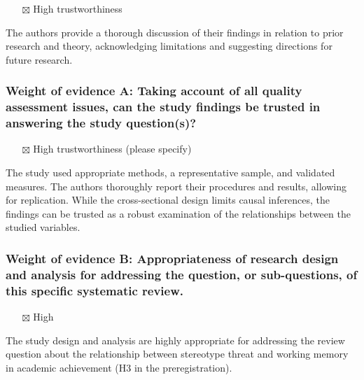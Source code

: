 \documentclass[
  doc, a4paper]{apa7}
\providecommand{\tightlist}{%
  \setlength{\itemsep}{0pt}\setlength{\parskip}{0pt}}
\begin{document}
\begin{itemize}
\tightlist
\item[$\boxtimes$]
  High trustworthiness
\end{itemize}

The authors provide a thorough discussion of their findings in relation to prior research and theory, acknowledging limitations and suggesting directions for future research.

\subsubsection{Weight of evidence A: Taking account of all quality assessment issues, can the study findings be trusted in answering the study question(s)?}\label{weight-of-evidence-a-taking-account-of-all-quality-assessment-issues-can-the-study-findings-be-trusted-in-answering-the-study-questions}

\begin{itemize}
\tightlist
\item[$\boxtimes$]
  High trustworthiness (please specify)
\end{itemize}

The study used appropriate methods, a representative sample, and validated measures. The authors thoroughly report their procedures and results, allowing for replication. While the cross-sectional design limits causal inferences, the findings can be trusted as a robust examination of the relationships between the studied variables.

\subsubsection{Weight of evidence B: Appropriateness of research design and analysis for addressing the question, or sub-questions, of this specific systematic review.}\label{weight-of-evidence-b-appropriateness-of-research-design-and-analysis-for-addressing-the-question-or-sub-questions-of-this-specific-systematic-review.}

\begin{itemize}
\tightlist
\item[$\boxtimes$]
  High
\end{itemize}

The study design and analysis are highly appropriate for addressing the review question about the relationship between stereotype threat and working memory in academic achievement (H3 in the preregistration).
\end{document}
